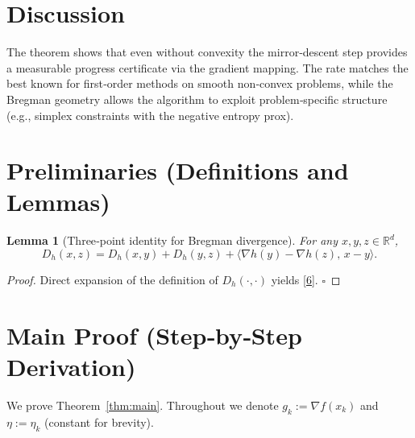 \documentclass{article}
\newtheorem{lemma}{Lemma}
\newcommand{\Breg}[2]{D_{h}(#1,#2)}
\newcommand{\grad}{\nabla}
\begin{document}
\section*{Discussion}
The theorem shows that even without convexity the mirror‑descent step provides a measurable progress certificate via the gradient mapping. The rate matches the best known for first‑order methods on smooth non‑convex problems, while the Bregman geometry allows the algorithm to exploit problem‑specific structure (e.g., simplex constraints with the negative entropy prox).

\newpage
\section*{Preliminaries (Definitions and Lemmas)}
\begin{lemma}[Three‑point identity for Bregman divergence]\label{lem:3pt}
For any $x,y,z\in\mathbb{R}^{d}$,
\[
\Breg{x}{z}= \Breg{x}{y}+ \Breg{y}{z}+ \langle \nabla h(y)-\nabla h(z),\,x-y\rangle .
\tag{6}
\]
\end{lemma}
\begin{proof}
Direct expansion of the definition of $\Breg{\cdot}{\cdot}$ yields \eqref{6}. \hfill $\square$
\end{proof}

\section*{Main Proof (Step‑by‑Step Derivation)}
We prove Theorem~\ref{thm:main}. Throughout we denote $g_k:=\grad f(x_k)$ and $\eta:=\eta_k$ (constant for brevity).
\end{document}
